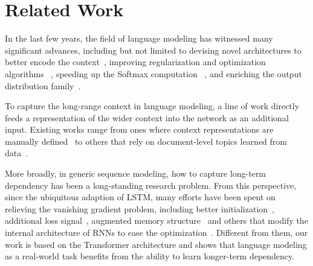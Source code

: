 \section{Related Work}
In the last few years, the field of language modeling has witnessed many significant advances, including but not limited to devising novel architectures to better encode the context~\citep{bengio2003neural,mikolov2010recurrent,
merity2016pointer,al2018character}, improving regularization and optimization algorithms~\cite{gal2016theoretically}
, speeding up the Softmax computation~\citep{grave2016efficient}
, and enriching the output distribution family~\citep{yang2017breaking}.

To capture the long-range context in language modeling, a line of work directly feeds a representation of the wider context into the network as an additional input.
Existing works range from ones where context representations are manually defined~\citep{mikolov2012context,ji2015document,wang2015larger} to others that rely on document-level topics learned from data~\citep{dieng2016topicrnn,wang2017topic}.

More broadly, in generic sequence modeling, how to capture long-term dependency has been a long-standing research problem.
From this perspective, since the ubiquitous adaption of LSTM, many efforts have been spent on relieving the vanishing gradient problem, including better initialization~\citep{le2015simple}, additional loss signal~\citep{trinh2018learning}, augmented memory structure~\citep{ke2018sparse} and others that modify the internal architecture of RNNs to ease the optimization~\cite{wu2016multiplicative,li2018independently}.
Different from them, our work is based on the Transformer architecture and shows that language modeling as a real-world task benefits from the ability to learn longer-term dependency.
